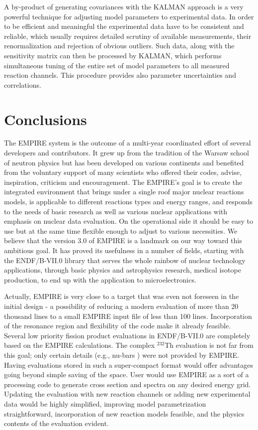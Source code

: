 A by-product of generating covariances with the KALMAN approach is a very
powerful technique for adjusting model parameters to experimental data. In
order to be efficient and meaningful the experimental data have to be
consistent and reliable, which usually requires detailed scrutiny of
available measurements, their renormalization and rejection of obvious
outliers. Such data, along with the sensitivity matrix can then be processed
by KALMAN, which performs simultaneous tuning of the entire set of model
parameters to all measured reaction channels. This procedure provides also
parameter uncertainties and correlations.

\section{Conclusions}

The EMPIRE system is the outcome of a multi-year coordinated effort of
several developers and contributors. It grew up from the tradition of the
Warsaw school of neutron physics but has been developed on various
continents and benefited from the voluntary support of many scientists who
offered their codes, advise, inspiration, criticism and encouragement. The
EMPIRE's goal is to create the integrated environment that brings under a
single roof major nuclear reactions models, is applicable to different
reactions types and energy ranges, and responds to the needs of basic
research as well as various nuclear applications with emphasis on nuclear
data evaluation. On the operational side it should be easy to use but at the
same time flexible enough to adjust to various necessities. We believe that
the version 3.0 of EMPIRE is a landmark on our way toward this ambitious
goal. It has proved its usefulness in a number of fields, starting with the
ENDF/B-VII.0 library that serves the whole rainbow of nuclear technology
applications, through basic physics and astrophysics research, medical
isotope production, to end up with the application to microelectronics.

Actually, EMPIRE is very close to a target that was even not foreseen in the
initial design - a possibility of reducing a modern evaluation of more than
20 thousand lines to a small EMPIRE input file of less than 100 lines.
Incorporation of the resonance region and flexibility of the code make it
already feasible. Several low priority fission product evaluations in
ENDF/B-VII.0 are completely based on the EMPIRE calculations. The complex $%
^{232}$Th evaluation is not far from this goal; only certain details (e.g.,
nu-bars ) were not provided by EMPIRE. Having evaluations stored in such a
super-compact format would offer advantages going beyond simple saving of
the space. User would use EMPIRE as a sort of a processing code to generate
cross section and spectra on any desired energy grid. Updating the
evaluation with new reaction channels or adding new experimental data would
be highly simplified, improving model parametrization straightforward,
incorporation of new reaction models feasible, and the physics contents of
the evaluation evident.

